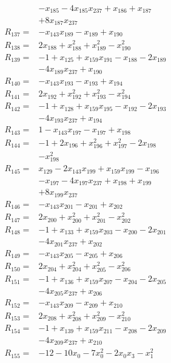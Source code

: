 \begin{align*}
&-x_{185} -4x_{185}x_{237} +x_{186} +x_{187}\\
&+8x_{187}x_{237}\\[3pt]
R_{137}={}&-x_{143}x_{189} -x_{189} +x_{190}\\[3pt]
R_{138}={}&2x_{188} +x_{188}^{2} +x_{189}^{2} -x_{190}^{2}\\[3pt]
R_{139}={}&-1 +x_{125} +x_{159}x_{191} -x_{188} -2x_{189}\\
&-4x_{189}x_{237} +x_{190}\\[3pt]
R_{140}={}&-x_{143}x_{193} -x_{193} +x_{194}\\[3pt]
R_{141}={}&2x_{192} +x_{192}^{2} +x_{193}^{2} -x_{194}^{2}\\[3pt]
R_{142}={}&-1 +x_{128} +x_{159}x_{195} -x_{192} -2x_{193}\\
&-4x_{193}x_{237} +x_{194}\\[3pt]
R_{143}={}&1 -x_{143}x_{197} -x_{197} +x_{198}\\[3pt]
R_{144}={}&-1 +2x_{196} +x_{196}^{2} +x_{197}^{2} -2x_{198}\\
&-x_{198}^{2}\\[3pt]
R_{145}={}&x_{129} -2x_{143}x_{199} +x_{159}x_{199} -x_{196}\\
&-x_{197} -4x_{197}x_{237} +x_{198} +x_{199}\\
&+8x_{199}x_{237}\\[3pt]
R_{146}={}&-x_{143}x_{201} -x_{201} +x_{202}\\[3pt]
R_{147}={}&2x_{200} +x_{200}^{2} +x_{201}^{2} -x_{202}^{2}\\[3pt]
R_{148}={}&-1 +x_{133} +x_{159}x_{203} -x_{200} -2x_{201}\\
&-4x_{201}x_{237} +x_{202}\\[3pt]
R_{149}={}&-x_{143}x_{205} -x_{205} +x_{206}\\[3pt]
R_{150}={}&2x_{204} +x_{204}^{2} +x_{205}^{2} -x_{206}^{2}\\[3pt]
R_{151}={}&-1 +x_{136} +x_{159}x_{207} -x_{204} -2x_{205}\\
&-4x_{205}x_{237} +x_{206}\\[3pt]
R_{152}={}&-x_{143}x_{209} -x_{209} +x_{210}\\[3pt]
R_{153}={}&2x_{208} +x_{208}^{2} +x_{209}^{2} -x_{210}^{2}\\[3pt]
R_{154}={}&-1 +x_{139} +x_{159}x_{211} -x_{208} -2x_{209}\\
&-4x_{209}x_{237} +x_{210}\\[3pt]
R_{155}={}&-12 -10x_{0} -7x_{0}^{2} -2x_{0}x_{3} -x_{1}^{2}\\

\end{align*}
